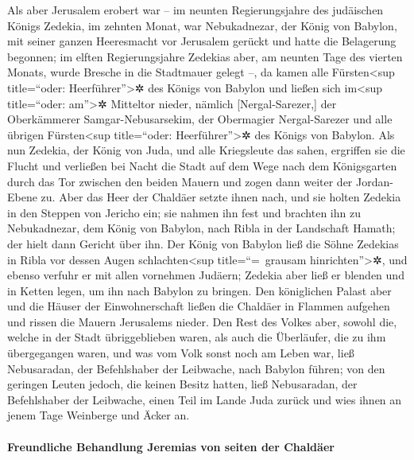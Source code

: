 Als aber Jerusalem erobert war -- im neunten
Regierungsjahre des judäischen Königs Zedekia, im zehnten Monat, war
Nebukadnezar, der König von Babylon, mit seiner ganzen Heeresmacht vor
Jerusalem gerückt und hatte die Belagerung begonnen; im
elften Regierungsjahre Zedekias aber, am neunten Tage des vierten
Monats, wurde Bresche in die Stadtmauer gelegt --, da
kamen alle Fürsten\textless sup title=``oder: Heerführer''\textgreater✲
des Königs von Babylon und ließen sich im\textless sup title=``oder:
am''\textgreater✲ Mitteltor nieder, nämlich {[}Nergal-Sarezer,{]} der
Oberkämmerer Samgar-Nebusarsekim, der Obermagier Nergal-Sarezer und alle
übrigen Fürsten\textless sup title=``oder: Heerführer''\textgreater✲ des
Königs von Babylon. Als nun Zedekia, der König von Juda,
und alle Kriegsleute das sahen, ergriffen sie die Flucht und verließen
bei Nacht die Stadt auf dem Wege nach dem Königsgarten durch das Tor
zwischen den beiden Mauern und zogen dann weiter der Jordan-Ebene zu.
Aber das Heer der Chaldäer setzte ihnen nach, und sie
holten Zedekia in den Steppen von Jericho ein; sie nahmen ihn fest und
brachten ihn zu Nebukadnezar, dem König von Babylon, nach Ribla in der
Landschaft Hamath; der hielt dann Gericht über ihn. Der
König von Babylon ließ die Söhne Zedekias in Ribla vor dessen Augen
schlachten\textless sup title=``=~grausam hinrichten''\textgreater✲, und
ebenso verfuhr er mit allen vornehmen Judäern; Zedekia
aber ließ er blenden und in Ketten legen, um ihn nach Babylon zu
bringen. Den königlichen Palast aber und die Häuser der
Einwohnerschaft ließen die Chaldäer in Flammen aufgehen und rissen die
Mauern Jerusalems nieder. Den Rest des Volkes aber, sowohl
die, welche in der Stadt übriggeblieben waren, als auch die Überläufer,
die zu ihm übergegangen waren, und was vom Volk sonst noch am Leben war,
ließ Nebusaradan, der Befehlshaber der Leibwache, nach Babylon führen;
von den geringen Leuten jedoch, die keinen Besitz hatten,
ließ Nebusaradan, der Befehlshaber der Leibwache, einen Teil im Lande
Juda zurück und wies ihnen an jenem Tage Weinberge und Äcker an.

\hypertarget{freundliche-behandlung-jeremias-von-seiten-der-chalduxe4er}{%
\paragraph{Freundliche Behandlung Jeremias von seiten der
Chaldäer}\label{freundliche-behandlung-jeremias-von-seiten-der-chalduxe4er}}

